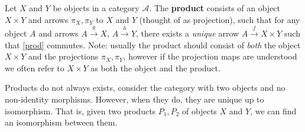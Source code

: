 \begin{definition}[Product]
    Let $X$ and $Y$ be objects in a category $\mathcal{A} $. The \textbf{product} consists of an object $X\times Y$ and arrows $\pi_X,\pi_Y$ to $X$ and $Y$ (thought of as projection), such that for any object $A$ and arrows $A\overset{g}{\to } X$, $A\overset{h}{\to } Y$, there exists a \emph{unique} arrow $A\overset{f}{\to } X\times Y$ such that \cref{prod} commutes. Note: usually the product should consist of \emph{both} the object $X\times Y$ and the projections $\pi_X,\pi_Y$, however if the projection maps are understood we often refer to $X\times Y$ as both the object and the product.
\end{definition}
\begin{claim}
    Products do not always exists, consider the category with two objects and no non-identity morphisms. However, when they do, they are unique up to isomorphism. That is, given two products $P_1,P_2$ of objects $X$ and $Y$, we can find an isomorphism between them. 
\end{claim}
